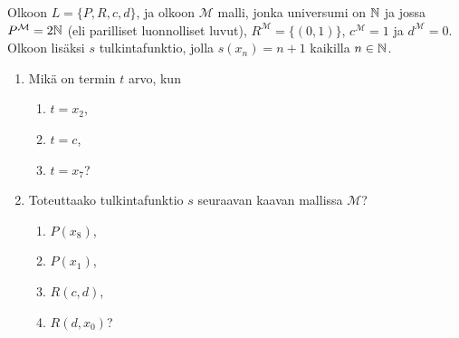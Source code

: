 \documentclass[11pt,a4paper]{amsart}
\begin{document}
\begin{exercise}
  Olkoon \(L = \{P, R, c, d\}\), ja olkoon \(\mathcal M\) malli, jonka
  universumi on \(\mathbb{N}\) ja jossa \(P^{\mathcal M} = 2\mathbb{N}\) (eli parilliset
  luonnolliset luvut), \(R^{\mathcal M} = \{(0,1)\}\),
  \(c^{\mathcal M} = 1\) ja \(d^{\mathcal M} = 0\). Olkoon lisäksi \(s\)
  tulkintafunktio, jolla \(s(x_n) = n + 1\) kaikilla \(n \in \mathbb{N}\).
  \begin{enumerate}[label=(\alph*)]
    \item Mikä on termin \(t\) arvo, kun
      \begin{enumerate}[label=(\alph*)]
        \item \(t = x_2\),
        \item \(t = c\),
        \item \(t = x_7\)?
      \end{enumerate}
    \item Toteuttaako tulkintafunktio \(s\) seuraavan kaavan mallissa
      \(\mathcal M\)?
      \begin{enumerate}[label=(\alph*)]
        \item \(P(x_8)\),
        \item \(P(x_1)\),
        \item \(R(c,d)\),
        \item \(R(d,x_0)\)?
      \end{enumerate}
  \end{enumerate}
\end{exercise}
\end{document}
